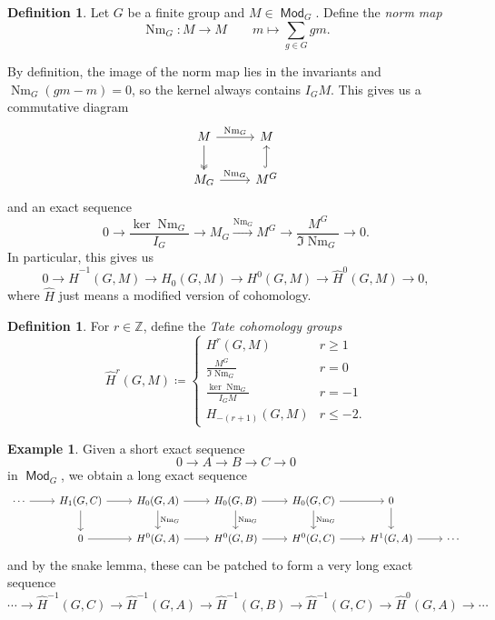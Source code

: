 \documentclass[leqno, openany]{memoir}
\theoremstyle{definition}
\newtheorem{defn}[thm]{Definition}
\newtheorem{exm}[thm]{Example}
\theoremstyle{remark}
\theoremstyle{plain}
\theoremstyle{definition}
\theoremstyle{remark}
\newcommand{\Z}{\mathbb{Z}}
\newcommand{\wh}[1]{\widehat{#1}}
\DeclareMathOperator{\Mod}{\mathsf{Mod}}
\DeclareMathOperator{\Nm}{Nm}
\begin{document}
\begin{defn}
    Let $G$ be a finite group and $M \in \Mod_G$. Define the \textit{norm map} 
    \[ \Nm_G \colon M \to M \qquad m \mapsto \sum_{g \in G} gm. \]
\end{defn}

By definition, the image of the norm map lies in the invariants and $\Nm_G (gm - m) = 0$, so the kernel always contains $I_G M$. This gives us a commutative diagram
\begin{equation*}
\begin{tikzcd}
    M \ar{r}{\Nm_G} \ar[twoheadrightarrow]{d} & M \\
    M_G \ar{r}{\Nm_G} & M^G \ar[hookrightarrow]{u}
\end{tikzcd}
\end{equation*}
and an exact sequence
\[ 0 \to \frac{\ker \Nm_G}{I_G} \to M_G \xrightarrow{\Nm_G} M^G \to \frac{M^G}{\Im \Nm_G} \to 0. \]
In particular, this gives us
\[ 0 \to \wh{H}^{-1}(G, M) \to H_0(G, M) \to H^0(G, M) \to \wh{H}^0(G, M) \to 0, \]
where $\wh{H}$ just means a modified version of cohomology.

\begin{defn}
    For $r \in \Z$, define the \textit{Tate cohomology groups}
    \[ \wh{H}^r(G, M) \coloneqq \begin{cases}
        H^r(G, M) & r \geq 1 \\
        \frac{M^G}{\Im \Nm_G} & r = 0 \\
        \frac{\ker \Nm_G}{I_G M} & r = -1 \\
        H_{-(r+1)}(G, M) & r \leq -2.
    \end{cases} \]
\end{defn}

\begin{exm}
    Given a short exact sequence
    \[ 0 \to A \to B \to C \to 0 \]
    in $\Mod_G$, we obtain a long exact sequence
    \begin{equation*}
    \begin{tikzcd}
        \cdots \ar{r} & H_1(G, C) \ar{d} \ar{r} & H_0(G, A) \ar{r} \ar{d}{\Nm_G} & H_0(G, B) \ar{r} \ar{d}{\Nm_G} & H_0(G, C) \ar{r} \ar{d}{\Nm_G} & 0 \ar{d} \\
                      & 0 \ar{r} & H^0(G, A) \ar{r} & H^0(G, B) \ar{r} & H^0(G, C) \ar{r} & H^1(G, A) \ar{r} & \cdots
    \end{tikzcd}
    \end{equation*}
    and by the snake lemma, these can be patched to form a very long exact sequence
    \[ \cdots \to \wh{H}^{-1}(G, C) \to \wh{H}^{-1}(G, A) \to \wh{H}^{-1}(G, B) \to \wh{H}^{-1}(G, C) \to \wh{H}^0(G, A) \to \cdots \]
\end{exm}
\end{document}

